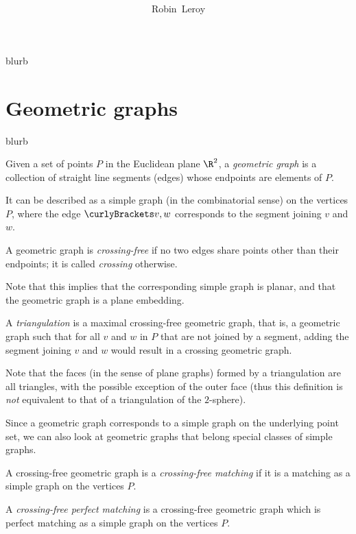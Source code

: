 \documentclass[10pt, a4paper, twoside]{basestyle}
\title{%
\textdisplay{%
Crossing-Free Perfect Matchings%
}%
}
\author{Robin~Leroy}
\begin{document}
\maketitle

blurb

\section{Geometric graphs} 
blurb
\begin{definition}
Given a set of points $P$ in the Euclidean plane $\R^2$,
a \emph{geometric graph} is a collection of straight line segments (edges)
whose endpoints are elements of $P$.

It can be described as a simple graph (in the combinatorial sense)
on the vertices $P$, where the edge $\set{v,w}$ corresponds to the segment joining
$v$ and $w$.
\end{definition}
\begin{definition}
A geometric graph is \emph{crossing-free} if no two edges share points other than
their endpoints; it is called \emph{crossing} otherwise.

Note that this implies that the corresponding simple graph is planar, and that the
geometric graph is a plane embedding.
\end{definition}
\begin{definition}[triangulation]
A \emph{triangulation} is a maximal crossing-free geometric graph, that is, a
geometric graph such that for all $v$ and $w$ in $P$ that are not joined by a
segment, adding the segment joining $v$ and $w$ would result in a crossing
geometric graph.

Note that the faces (in the sense of plane graphs) formed by a triangulation are
all triangles, with the possible exception of the outer face (thus this definition
is \emph{not} equivalent to that of a triangulation of the $2$-sphere).
\end{definition}

Since a geometric graph corresponds to a simple graph on the underlying point set,
we can also look at geometric graphs that belong special classes of simple graphs.
\begin{definition}
A crossing-free geometric graph is a \emph{crossing-free matching} if it is a matching
as a simple graph on the vertices $P$.
\end{definition}
\begin{definition}
A \emph{crossing-free perfect matching} is a crossing-free geometric graph which is
perfect matching as a simple graph on the vertices $P$.
\end{definition}
\end{document}

